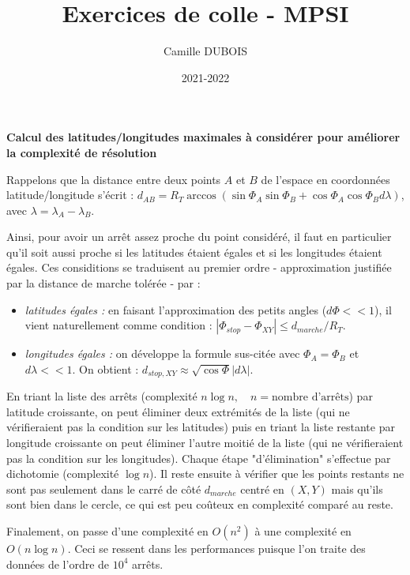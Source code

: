 \documentclass[12pt,oneside]{article}
\title{Exercices de colle - MPSI}
\author{Camille DUBOIS}
\date{2021-2022}
\begin{document}
\maketitle

\tableofcontents


\textbf{Calcul des latitudes/longitudes maximales à considérer pour améliorer la complexité de résolution}

Rappelons que la distance entre deux points $A$ et $B$ de l'espace en coordonnées latitude/longitude s'écrit : $d_{AB} = R_T \arccos ( \sin \Phi_A \sin \Phi_B + \cos \Phi_A \cos \Phi_B d \lambda)$, avec $\lambda = \lambda_A - \lambda_B$.

Ainsi, pour avoir un arrêt assez proche du point considéré, il faut en particulier qu'il soit aussi proche si les latitudes étaient égales et si les longitudes étaient égales. Ces considitions se traduisent au premier ordre - approximation justifiée par la distance de marche tolérée - par :
\begin{itemize}
    \item \textit{latitudes égales : } en faisant l'approximation des petits angles ($d \Phi << 1$), il vient naturellement comme condition : $|\Phi_{stop} - \Phi_{XY}| \leq d_{marche}/R_T$.
    \item \textit{longitudes égales : } on développe la formule sus-citée avec $\Phi_A = \Phi_B$ et $d\lambda << 1$. On obtient : $d_{stop, XY} \approx \sqrt{\cos \Phi} |d\lambda|$.
\end{itemize}

En triant la liste des arrêts (complexité $n \log n, \quad n = \text{nombre d'arrêts}$) par latitude croissante, on peut éliminer deux extrémités de la liste (qui ne vérifieraient pas la condition sur les latitudes) puis en triant la liste restante par longitude croissante on peut éliminer l'autre moitié de la liste (qui ne vérifieraient pas la condition sur les longitudes). Chaque étape "d'élimination" s'effectue par dichotomie (complexité $\log n$). Il reste ensuite à vérifier que les points restants ne sont pas seulement dans le carré de côté $d_{marche}$ centré en $(X, Y)$ mais qu'ils sont bien dans le cercle, ce qui est peu coûteux en complexité comparé au reste.

Finalement, on passe d'une complexité en $O(n^2)$ à une complexité en $O(n \log n)$. Ceci se ressent dans les performances puisque l'on traite des données de l'ordre de $10^4$ arrêts.
\end{document}
